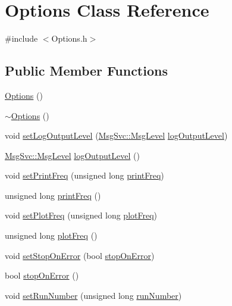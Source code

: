 \hypertarget{classOptions}{}\section{Options Class Reference}
\label{classOptions}


{\ttfamily \#include $<$Options.\+h$>$}

\subsection*{Public Member Functions}
\begin{DoxyCompactItemize}
\item 
\hyperlink{classOptions_ab72fb640172a6109e34c8a5366563753}{Options} ()
\item 
\hyperlink{classOptions_a86ddb85b183f8b58af5481f30a42fa92}{$\sim$\+Options} ()
\item 
void \hyperlink{classOptions_a5d8ab053c941a944a53c0bfe871058a1}{set\+Log\+Output\+Level} (\hyperlink{classMsgSvc_ae671eb7301996cd049d2da8a65925926}{Msg\+Svc\+::\+Msg\+Level} \hyperlink{classOptions_a2d11716f34070dd7991648a26eb5d244}{log\+Output\+Level})
\item 
\hyperlink{classMsgSvc_ae671eb7301996cd049d2da8a65925926}{Msg\+Svc\+::\+Msg\+Level} \hyperlink{classOptions_a2d11716f34070dd7991648a26eb5d244}{log\+Output\+Level} ()
\item 
void \hyperlink{classOptions_adac15a8dbae0183ae7cecc09ebba6887}{set\+Print\+Freq} (unsigned long \hyperlink{classOptions_a67021ffef9f666bba4696f89807b2a70}{print\+Freq})
\item 
unsigned long \hyperlink{classOptions_a67021ffef9f666bba4696f89807b2a70}{print\+Freq} ()
\item 
void \hyperlink{classOptions_a7df298047f1506fa2244cf096da96409}{set\+Plot\+Freq} (unsigned long \hyperlink{classOptions_a1e20abb20c1a2187f9455b39cd9d26ae}{plot\+Freq})
\item 
unsigned long \hyperlink{classOptions_a1e20abb20c1a2187f9455b39cd9d26ae}{plot\+Freq} ()
\item 
void \hyperlink{classOptions_a0d362af154c7d2e30a7bf340eb061fa5}{set\+Stop\+On\+Error} (bool \hyperlink{classOptions_afcd7b27fdf474050d912571e09525efe}{stop\+On\+Error})
\item 
bool \hyperlink{classOptions_afcd7b27fdf474050d912571e09525efe}{stop\+On\+Error} ()
\item 
void \hyperlink{classOptions_aed19a55eb2c418f333bc97615cf4a3a8}{set\+Run\+Number} (unsigned long \hyperlink{classOptions_a2d9447919fe90f9ce8df5530526cbb27}{run\+Number})

\end{DoxyCompactItemize}
